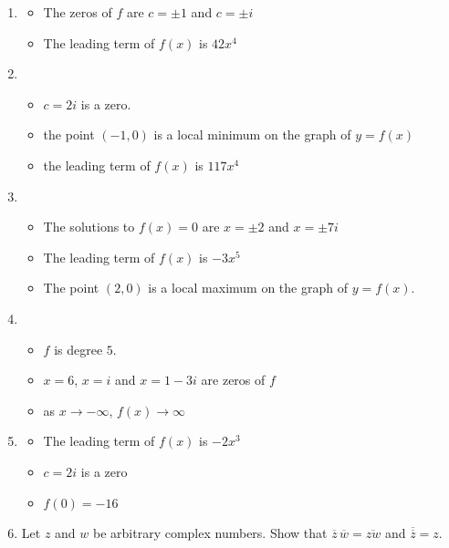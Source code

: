 \begin{enumerate}
\setcounter{enumi}{\value{HW}}

\item \label{buildcomppolyfirst}

\begin{itemize}

\item The zeros of $f$ are $c=\pm 1$ and $c = \pm i$
\item The leading term of $f(x)$ is $42x^4$

\end{itemize}


\item

\begin{itemize}

\item $c=2i$ is a zero.
\item the point $(-1,0)$ is a local minimum on the graph of $y=f(x)$ 
\item the leading term of $f(x)$ is $117x^4$

\end{itemize}


\item

\begin{itemize}

\item The solutions to $f(x) = 0$ are $x = \pm 2$ and $x=\pm 7i$
\item The leading term of $f(x)$ is $-3x^5$
\item The point $(2,0)$ is a local maximum on the graph of $y=f(x)$.

\end{itemize}


\item

\begin{itemize}

\item $f$ is degree $5$.
\item $x=6$, $x = i$ and $x = 1-3i$ are zeros of $f$
\item as $x \rightarrow -\infty$, $f(x) \rightarrow \infty$

\end{itemize}

\item \label{buildcompolylast}

\begin{itemize}

\item The leading term of $f(x)$ is $-2x^3$
\item $c=2i$ is a zero
\item $f(0) = -16$

\end{itemize}


\item \label{zbarexercise} Let $z$ and $w$ be arbitrary complex numbers.  Show that  $\overline{z} \, \overline{w}  = \overline{zw}$ and $\overline{\overline{z}} = z$.

\end{enumerate}

